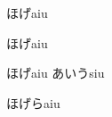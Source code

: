 \documentclass{ltjtarticle}
\begin{document}
\begin{boxnote}
 ほげaiu
\end{boxnote}

\begin{screen}[5pt]
 ほげaiu
\end{screen}


\begin{itembox}[l]{ほげaiu}
 あいうsiu
\end{itembox}

\yen\return\Return




\begin{shadebox}
 ほげらaiu
\end{shadebox}
\end{document}
